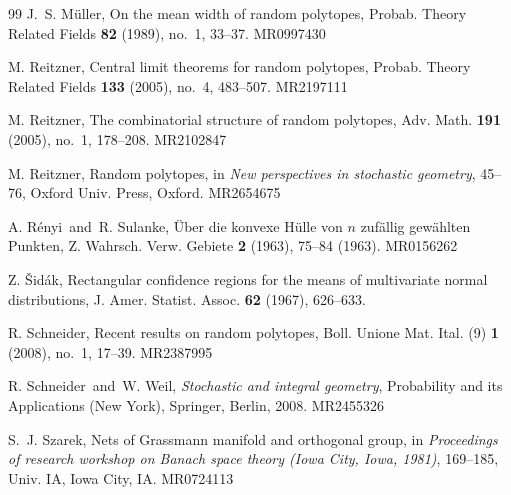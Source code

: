 \documentclass[11pt]{amsart}
\theoremstyle{definition}
\theoremstyle{plain}
\begin{document}
\begin{thebibliography}{99}
{
J.~S. M\"{u}ller, On the mean width of random polytopes, Probab. Theory Related Fields {\bf 82} (1989), no.~1, 33--37. MR0997430
}




{
M. Reitzner, Central limit theorems for random polytopes, Probab. Theory Related Fields {\bf 133} (2005), no.~4, 483--507. MR2197111
}

{
M. Reitzner, The combinatorial structure of random polytopes, Adv. Math. {\bf 191} (2005), no.~1, 178--208. MR2102847
}

{
M. Reitzner, Random polytopes, in {\it New perspectives in stochastic geometry}, 45--76, Oxford Univ. Press, Oxford. MR2654675
}

{
A. R\'{e}nyi\ and\ R. Sulanke, \"{U}ber die konvexe H\"{u}lle von $n$ zuf\"{a}llig gew\"{a}hlten Punkten, Z. Wahrsch. Verw. Gebiete {\bf 2} (1963), 75--84 (1963). MR0156262
}

{
Z. \v{S}id\'{a}k, Rectangular confidence regions for the means of multivariate normal distributions, J. Amer. Statist. Assoc. {\bf 62} (1967), 626--633.
}

{
R. Schneider, Recent results on random polytopes, Boll. Unione Mat. Ital. (9) {\bf 1} (2008), no.~1, 17--39. MR2387995
}

{
R. Schneider\ and\ W. Weil, {\it Stochastic and integral geometry}, Probability and its Applications (New York), Springer, Berlin, 2008. MR2455326
}

{
S.~J. Szarek, Nets of Grassmann manifold and orthogonal group, in {\it Proceedings of research workshop on Banach space theory (Iowa City, Iowa, 1981)}, 169--185, Univ. IA, Iowa City, IA. MR0724113
}



\end{thebibliography}
\end{document}
